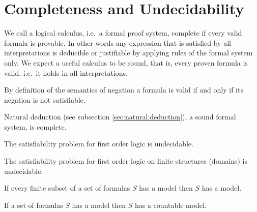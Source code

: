 

\chapter{Completeness and Undecidability}

	We call a logical calculus, i.e.~a formal proof system, {\myem complete} if every valid formula is provable.
	In other words any expression that is satisfied by all interpretations 
	is deducible or justifiable by applying rules of the formal system only.
	We expect a useful calculus to be {\myem sound}, that is, every proven formula is valid, 
	i.e.~it holds in all interpretations.

\begin{lemma}[Refutation]
	By definition of the semantics of negation a formula is valid if and only if its negation is not satisfiable.
\end{lemma}

\begin{theorem}
	Natural deduction (see subsection \vref{sec:natural:deduction}), a sound formal system, is complete.
\end{theorem}

\begin{theorem}
	The satisfiability problem for first order logic is undecidable.
\end{theorem}

\begin{theorem}
	The satisfiability problem for first order logic on {\myem finite} structures (domains) is undecidable.
\end{theorem}

\begin{theorem}
\end{theorem}








\begin{theorem}[Compactness]\label{the:compactness}
	If every finite subset of a set of formulas $S$ has a model then $S$ has a model. 
\end{theorem}

\begin{theorem}\label{the:loewenheim}
	If a set of formulas $S$ has a model then $S$ has a countable model.
\end{theorem}


